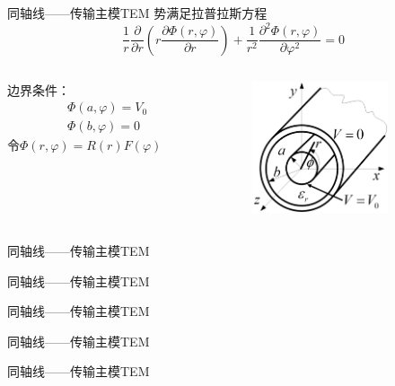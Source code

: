 \begin{frame}{同轴线——传输主模TEM}
    势满足拉普拉斯方程
    $$\frac{1}{r}\frac{\partial}{\partial r}\left(r\frac{\partial\Phi(r,\varphi)}{\partial r}\right)+\frac{1}{r^2}\frac{\partial^2\Phi(r,\varphi)}{\partial\varphi^2}=0$$
    \begin{columns}
        \begin{column}{0.5\linewidth}
            边界条件：\\
            \begin{align*}
                &\Phi(a,\varphi)=V_0\\
                &\Phi(b,\varphi)=0
            \end{align*}
            令$\Phi(r,\varphi)=R(r)F(\varphi)$
        \end{column}
        \begin{column}{0.5\linewidth}
            \begin{figure}
                \includegraphics[width=4cm]{Cha6//fig6-30.png}
            \end{figure}
        \end{column}
    \end{columns}
\end{frame}

\begin{frame}{同轴线——传输主模TEM}

\end{frame}

\begin{frame}{同轴线——传输主模TEM}

\end{frame}

\begin{frame}{同轴线——传输主模TEM}

\end{frame}

\begin{frame}{同轴线——传输主模TEM}

\end{frame}

\begin{frame}{同轴线——传输主模TEM}

\end{frame}

